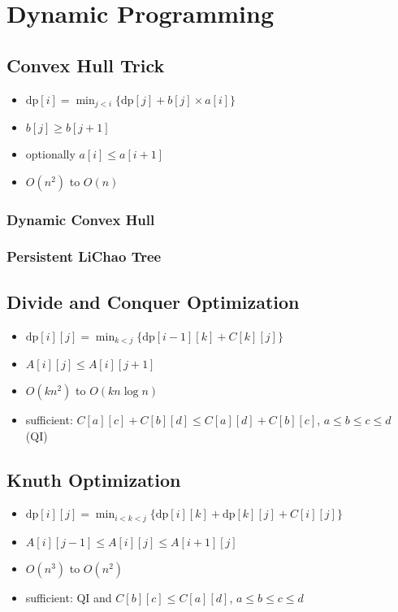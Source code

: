 \section{Dynamic Programming}
  \subsection{Convex Hull Trick}
    \begin{itemize}
      \item $\mathrm{dp}[i] = \min_{j<i}\{\mathrm{dp}[j] + b[j] \times a[i]\}$
      \item $b[j] \geq b[j+1]$
      \item optionally $a[i] \leq a[i+1]$
      \item $O(n^2)$ to $O(n)$
    \end{itemize}
    \subsubsection{Dynamic Convex Hull}
    \subsubsection{Persistent LiChao Tree}
  \subsection{Divide and Conquer Optimization}
    \begin{itemize}
      \item $\mathrm{dp}[i][j] = \min_{k<j}\{\mathrm{dp}[i-1][k] + C[k][j]\}$
      \item $A[i][j] \leq A[i][j+1]$
      \item $O(kn^2)$ to $O(kn\log{n})$
      \item sufficient: $C[a][c] + C[b][d] \leq C[a][d] + C[b][c]$, $a\leq b\leq c\leq d$ (QI)
    \end{itemize}
  \subsection{Knuth Optimization}
    \begin{itemize}
      \item $\mathrm{dp}[i][j] = \min_{i<k<j}\{\mathrm{dp}[i][k] + \mathrm{dp}[k][j] + C[i][j]\}$
      \item $A[i][j-1] \leq A[i][j] \leq A[i+1][j]$
      \item $O(n^3)$ to $O(n^2)$
      \item sufficient: QI and $C[b][c] \leq C[a][d]$, $a\leq b\leq c\leq d$
    \end{itemize}
